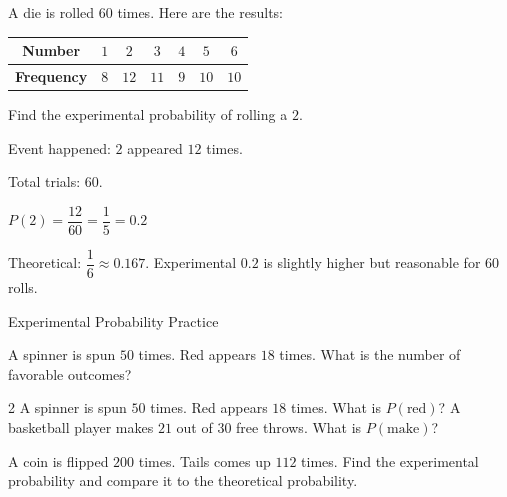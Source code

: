 \begin{stepExample}{A die is rolled $60$ times. Here are the results: \newline
\begin{tabular}{c|c|c|c|c|c|c}
\textbf{Number} & $1$ & $2$ & $3$ & $4$ & $5$ & $6$ \\ \hline
\textbf{Frequency} & $8$ & $12$ & $11$ & $9$ & $10$ & $10$
\end{tabular} \newline
Find the experimental probability of rolling a $2$.}
     Event happened: $2$ appeared $12$ times.

     Total trials: $60$.

     $P(2) = \dfrac{12}{60} = \dfrac{1}{5} = 0.2$

     Theoretical: $\dfrac{1}{6} \approx 0.167$. Experimental $0.2$ is slightly higher but reasonable for $60$ rolls.
\end{stepExample}


\newpage
\begin{stepPractice}{Experimental Probability Practice}
    \resetProblems

    \prob A spinner is spun $50$ times. Red appears $18$ times. What is the number of favorable outcomes? \answerBlank[2cm]

    \begin{multicols}{2}
    \prob A spinner is spun $50$ times. Red appears $18$ times. What is $P(\text{red})$? \answerBlank[2cm]
    \prob A basketball player makes $21$ out of $30$ free throws. What is $P(\text{make})$? \answerBlank[2cm]
    \end{multicols}

    \prob A coin is flipped $200$ times. Tails comes up $112$ times. Find the experimental probability and compare it to the theoretical probability. \answerBlank[3cm]

\end{stepPractice}
